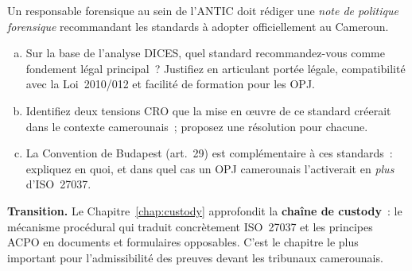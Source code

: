 \begin{boxexo}[title={\ding{45}\quad Exercice~7.3 --- Analyse comparative DICES \niveauexpert}]
Un responsable forensique au sein de l'ANTIC doit rédiger une
\textit{note de politique forensique} recommandant les standards à adopter
officiellement au Cameroun.
\begin{enumerate}[(a)]
    \item Sur la base de l'analyse DICES, quel standard recommandez-vous
          comme fondement légal principal~? Justifiez en articulant portée
          légale, compatibilité avec la Loi~2010/012 et facilité de
          formation pour les OPJ.
    \item Identifiez deux tensions CRO que la mise en \oe uvre de ce standard
          créerait dans le contexte camerounais~; proposez une résolution
          pour chacune.
    \item La Convention de Budapest (art.~29) est complémentaire à ces
          standards~: expliquez en quoi, et dans quel cas un OPJ camerounais
          l'activerait en \emph{plus} d'ISO~27037.
\end{enumerate}
\end{boxexo}

\bigskip

\begin{boxinfo}
\textbf{Transition.} Le Chapitre~\ref{chap:custody} approfondit la
\textbf{chaîne de custody}~: le mécanisme procédural qui traduit concrètement
ISO~27037 et les principes ACPO en documents et formulaires opposables.
C'est le chapitre le plus important pour l'admissibilité des preuves
devant les tribunaux camerounais.
\end{boxinfo}